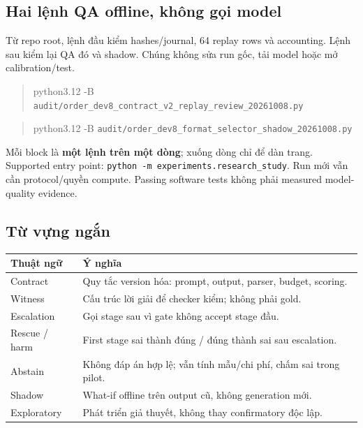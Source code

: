 \documentclass[11pt,a4paper]{article}
\begin{document}
\subsection*{Hai lệnh QA offline, không gọi model}
Từ repo root, lệnh đầu kiểm hashes/journal, 64 replay rows và accounting. Lệnh sau kiểm lại QA đó và shadow. Chúng không sửa run gốc, tải model hoặc mở calibration/test.
\begin{quote}\small\ttfamily
python3.12 -B
\nolinkurl{audit/order_dev8_contract_v2_replay_review_20261008.py}
\end{quote}
\begin{quote}\small\ttfamily
python3.12 -B
\nolinkurl{audit/order_dev8_format_selector_shadow_20261008.py}
\end{quote}
Mỗi block là \textbf{một lệnh trên một dòng}; xuống dòng chỉ để dàn trang. Supported entry point: \texttt{python -m experiments.research\_study}. Run mới vẫn cần protocol/quyền compute. Passing software tests không phải measured model-quality evidence.

\subsection*{Từ vựng ngắn}
\begin{tabularx}{\textwidth}{@{}p{30mm}Y@{}}
\toprule
\textbf{Thuật ngữ} & \textbf{Ý nghĩa}\\
\midrule
Contract & Quy tắc version hóa: prompt, output, parser, budget, scoring.\\
Witness & Cấu trúc lời giải để checker kiểm; không phải gold.\\
Escalation & Gọi stage sau vì gate không accept stage đầu.\\
Rescue / harm & First stage sai thành đúng / đúng thành sai sau escalation.\\
Abstain & Không đáp án hợp lệ; vẫn tính mẫu/chi phí, chấm sai trong pilot.\\
Shadow & What-if offline trên output cũ, không generation mới.\\
Exploratory & Phát triển giả thuyết, không thay confirmatory độc lập.\\
\bottomrule
\end{tabularx}
\end{document}
